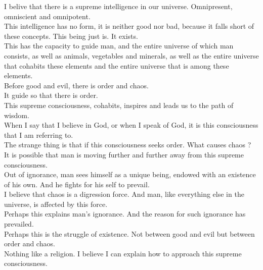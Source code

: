 \documentclass{book}
\begin{document}
I belive that there is a supreme intelligence in our universe. Omnipresent, omniscient and omnipotent. \\

This intelligence has no form, it is neither good nor bad, because it falls short of these concepts. This being just is. It exists. \\

This has the capacity to guide man, and the entire universe of which man consists, as well as animals, vegetables and minerals, as well as the entire universe that cohabits these elements and the entire universe that is among these elements. \\

Before good and evil, there is order and chaos. \\

It guide so that there is order. \\

This supreme consciousness, cohabits, inspires and leads us to the path of wisdom. \\

When I say that I believe in God, or when I speak of God, it is this consciousness that I am referring to. \\

The strange thing is that if this consciousness seeks order. What causes chaos ? \\

It is possible that man is moving further and further away from this supreme consciousness. \\

Out of ignorance, man sees himself as a unique being, endowed with an existence of his own. And he fights for his self to prevail. \\

I believe that chaos is a digression force. And man, like everything else in the universe, is affected by this force. \\

Perhaps this explains man's ignorance. And the reason for such ignorance has prevailed. \\

Perhaps this is the struggle of existence. Not between good and evil but between order and chaos. \\

Nothing like a religion. I believe I can explain how to approach this supreme consciousness. \\
\end{document}
